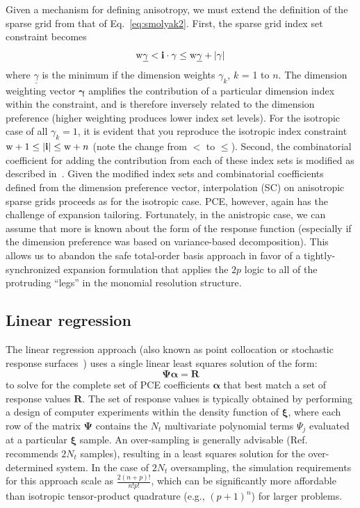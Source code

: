 Given a mechanism for defining anisotropy, we must extend the
definition of the sparse grid from that of Eq.~\ref{eq:smolyak2}.
First, the sparse grid index set constraint becomes
\begin{equation}
{\rm w}\underline{\gamma} < \mathbf{i} \cdot \mathbf{\gamma} \leq 
{\rm w}\underline{\gamma}+|\mathbf{\gamma}|
\label{eq:aniso_smolyak_constr}
\end{equation}
where $\underline{\gamma}$ is the minimum if the dimension weights
$\gamma_k$, $k$ = 1 to $n$.  The dimension weighting vector
$\mathbf{\gamma}$ amplifies the contribution of a particular dimension
index within the constraint, and is therefore inversely related to the
dimension preference (higher weighting produces lower index set
levels).  For the isotropic case of all $\gamma_k = 1$, it is evident
that you reproduce the isotropic index constraint ${\rm w}+1 \leq
|\mathbf{i}| \leq {\rm w}+n$ (note the change from $<$ to $\leq$).
Second, the combinatorial coefficient for adding the contribution from
each of these index sets is modified as described in~\cite{Burk09}.
Given the modified index sets and combinatorial coefficients defined
from the dimension preference vector, interpolation (SC) on
anisotropic sparse grids proceeds as for the isotropic case.  PCE,
however, again has the challenge of expansion tailoring.  Fortunately,
in the anistropic case, we can assume that more is known about the
form of the response function (especially if the dimension preference
was based on variance-based decomposition).  This allows us to abandon
the safe total-order basis approach in favor of a tightly-synchronized
expansion formulation that applies the $2p$ logic to all of the
protruding ``legs'' in the monomial resolution structure.


\subsection{Linear regression} \label{uq:expansion:regress}

The linear regression approach (also known as point collocation or
stochastic response surfaces~\cite{pt_colloc1,pt_colloc2}) uses a
single linear least squares solution of the form:
\begin{equation}
\boldsymbol{\Psi} \boldsymbol{\alpha} = \boldsymbol{R} \label{eq:regression}
\end{equation}
to solve for the complete set of PCE coefficients
$\boldsymbol{\alpha}$ that best match a set of response values
$\boldsymbol{R}$.  The set of response values is typically obtained by
performing a design of computer experiments within the density
function of $\boldsymbol{\xi}$, where each row of the matrix
$\boldsymbol{\Psi}$ contains the $N_t$ multivariate polynomial terms
$\Psi_j$ evaluated at a particular $\boldsymbol{\xi}$ sample.  An
over-sampling is generally advisable (Ref.~\cite{pt_colloc2}
recommends $2N_t$ samples), resulting in a least squares solution for
the over-determined system.  In the case of $2N_t$ oversampling, the
simulation requirements for this approach scale as
$\frac{2(n+p)!}{n!p!}$, which can be significantly more affordable
than isotropic tensor-product quadrature (e.g., $(p+1)^n$) for larger
problems.


